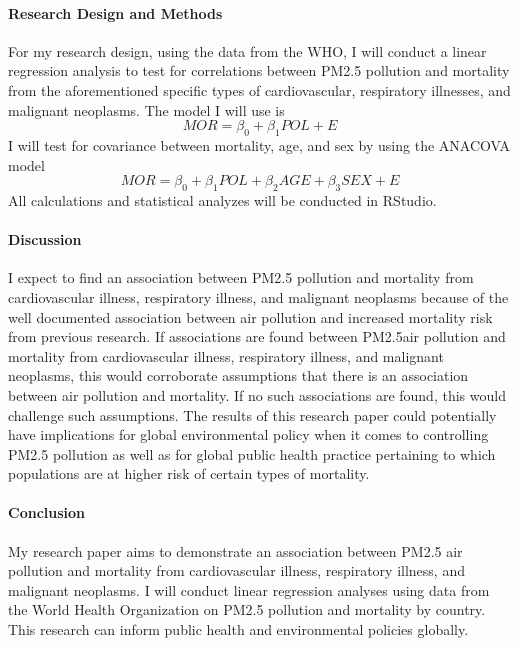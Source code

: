 \documentclass[12pt]{article}\usepackage[]{graphicx}\usepackage[]{xcolor}
\begin{document}
\paragraph{Research Design and Methods}
For my research design, using the data from the WHO, I will conduct a linear regression analysis to test for correlations between PM2.5 pollution and mortality from the aforementioned specific types of cardiovascular, respiratory illnesses, and malignant neoplasms. The model I will use is
\[
  MOR = \beta_{0} + \beta_{1}POL + E
\]
I will test for covariance between mortality, age, and sex by using the ANACOVA model
\[
  MOR = \beta_{0} + \beta_{1}POL + \beta_{2}AGE + \beta_{3}SEX + E
\]
All calculations and statistical analyzes will be conducted in RStudio.

\paragraph{Discussion}
I expect to find an association between PM2.5 pollution and mortality from cardiovascular illness, respiratory illness, and malignant neoplasms because of the well documented association between air pollution and increased mortality risk from previous research. If associations are found between PM2.5air pollution and mortality from cardiovascular illness, respiratory illness, and malignant neoplasms, this would corroborate assumptions that there is an association between air pollution and mortality. If no such associations are found, this would challenge such assumptions. The results of this research paper could potentially have implications for global environmental policy when it comes to controlling PM2.5 pollution as well as for global public health practice pertaining to which populations are at higher risk of certain types of mortality.

\paragraph{Conclusion}
My research paper aims to demonstrate an association between PM2.5 air pollution and mortality from cardiovascular illness, respiratory illness, and malignant neoplasms. I will conduct linear regression analyses using data from the World Health Organization on PM2.5 pollution and mortality by country. This research can inform public health and environmental policies globally.



\end{document}
